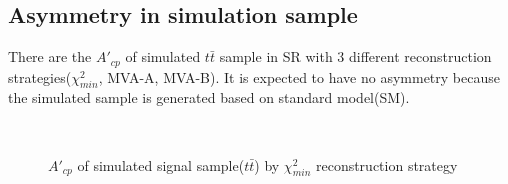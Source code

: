 	\subsection{Asymmetry in simulation sample}
	\label{ssec:Asym_in_sim}

		There are the $A'_{cp}$ of simulated $t\bar{t}$ sample in SR with 3 different reconstruction strategies($\chi^2_{min}$, MVA-A, MVA-B). It is expected to have no asymmetry because the simulated sample is generated based on standard model(SM).


		\begin{figure}[H]
			\centering
				\\
		\caption{$A'_{cp}$ of simulated signal sample($t\bar{t}$) by $\chi^2_{min}$ reconstruction strategy}
		\label{AsymBias:fig:chi2_sim_tt_A'cp}
		\end{figure}
		\FloatBarrier

